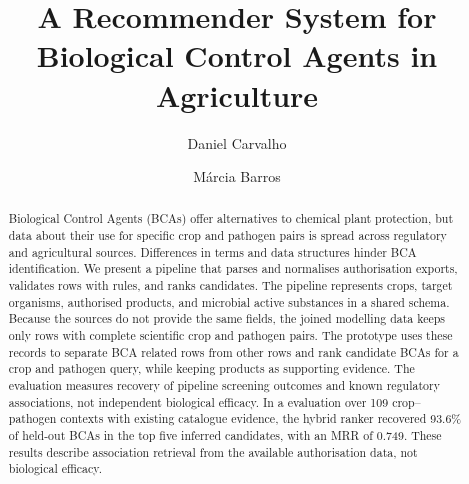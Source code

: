 \documentclass[sigconf,nonacm]{acmart}
\begin{document}

    \title{A Recommender System for Biological Control Agents in Agriculture}

    \author{Daniel Carvalho}
    \author{Márcia Barros}
    \renewcommand{\shortauthors}{Carvalho and Barros}

    \begin{abstract}
        Biological Control Agents (BCAs) offer alternatives to chemical plant protection, but data about their use for
        specific crop and pathogen pairs is spread across regulatory and agricultural sources. Differences in terms
        and data structures hinder BCA identification. We present a pipeline that parses and normalises authorisation
        exports, validates rows with rules, and ranks candidates. The pipeline represents crops, target organisms,
        authorised products, and microbial active substances in a shared schema. Because the sources do not provide
        the same fields, the joined modelling data keeps only rows with complete scientific crop and pathogen pairs.
        The prototype uses these records to separate BCA related rows from other rows and rank candidate BCAs for a
        crop and pathogen query, while keeping products as supporting evidence. The evaluation measures recovery of
        pipeline screening outcomes and known regulatory associations, not independent biological efficacy. In a
        evaluation over 109 crop--pathogen contexts with existing catalogue evidence, the hybrid ranker recovered 93.6\% of held-out BCAs
        in the top five inferred candidates, with an MRR of 0.749. These results describe association retrieval from
        the available authorisation data, not biological efficacy.

    \end{abstract}


    \maketitle

    
\end{document}
